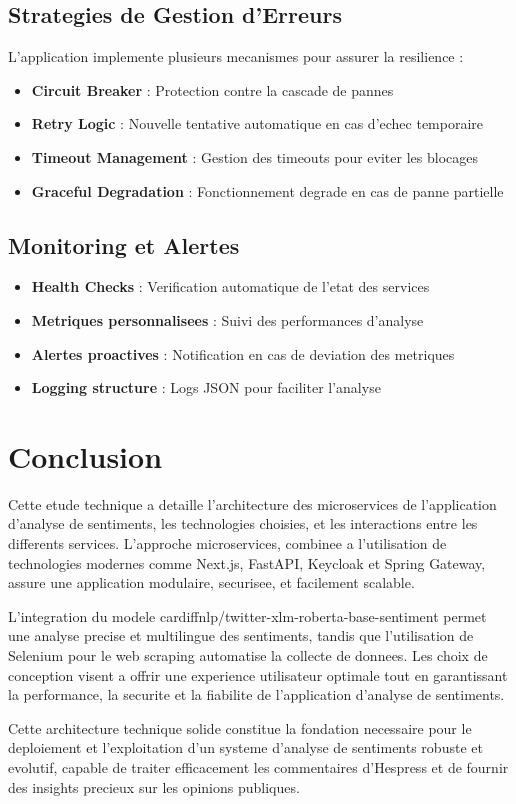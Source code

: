 \subsection{Strategies de Gestion d'Erreurs}

L'application implemente plusieurs mecanismes pour assurer la resilience :

\begin{itemize}
    \item \textbf{Circuit Breaker} : Protection contre la cascade de pannes
    \item \textbf{Retry Logic} : Nouvelle tentative automatique en cas d'echec temporaire
    \item \textbf{Timeout Management} : Gestion des timeouts pour eviter les blocages
    \item \textbf{Graceful Degradation} : Fonctionnement degrade en cas de panne partielle
\end{itemize}

\subsection{Monitoring et Alertes}

\begin{itemize}
    \item \textbf{Health Checks} : Verification automatique de l'etat des services
    \item \textbf{Metriques personnalisees} : Suivi des performances d'analyse
    \item \textbf{Alertes proactives} : Notification en cas de deviation des metriques
    \item \textbf{Logging structure} : Logs JSON pour faciliter l'analyse
\end{itemize}

\section{Conclusion}

Cette etude technique a detaille l'architecture des microservices de l'application d'analyse de sentiments, les technologies choisies, et les interactions entre les differents services. L'approche microservices, combinee a l'utilisation de technologies modernes comme Next.js, FastAPI, Keycloak et Spring Gateway, assure une application modulaire, securisee, et facilement scalable.

L'integration du modele cardiffnlp/twitter-xlm-roberta-base-sentiment permet une analyse precise et multilingue des sentiments, tandis que l'utilisation de Selenium pour le web scraping automatise la collecte de donnees. Les choix de conception visent a offrir une experience utilisateur optimale tout en garantissant la performance, la securite et la fiabilite de l'application d'analyse de sentiments.

Cette architecture technique solide constitue la fondation necessaire pour le deploiement et l'exploitation d'un systeme d'analyse de sentiments robuste et evolutif, capable de traiter efficacement les commentaires d'Hespress et de fournir des insights precieux sur les opinions publiques.
